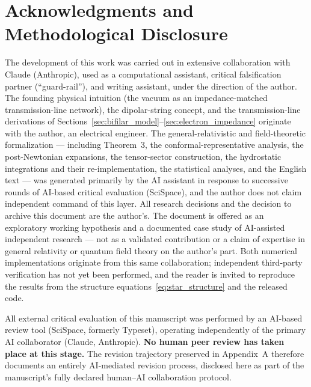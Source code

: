 \documentclass[11pt,a4paper]{article}
\theoremstyle{plain}
\theoremstyle{remark}
\begin{document}
\section*{Acknowledgments and Methodological Disclosure}
The development of this work was carried out in extensive collaboration with Claude (Anthropic), used as a computational assistant, critical falsification partner (``guard-rail''), and writing assistant, under the direction of the author. The founding physical intuition (the vacuum as an impedance-matched transmission-line network), the dipolar-string concept, and the transmission-line derivations of Sections~\ref{sec:bifilar_model}--\ref{sec:electron_impedance} originate with the author, an electrical engineer. The general-relativistic and field-theoretic formalization --- including Theorem~3, the conformal-representative analysis, the post-Newtonian expansions, the tensor-sector construction, the hydrostatic integrations and their re-implementation, the statistical analyses, and the English text --- was generated primarily by the AI assistant in response to successive rounds of AI-based critical evaluation (SciSpace), and the author does not claim independent command of this layer. All research decisions and the decision to archive this document are the author's. The document is offered as an exploratory working hypothesis and a documented case study of AI-assisted independent research --- not as a validated contribution or a claim of expertise in general relativity or quantum field theory on the author's part. Both numerical implementations originate from this same collaboration; independent third-party verification has not yet been performed, and the reader is invited to reproduce the results from the structure equations~\eqref{eq:star_structure} and the released code.

All external critical evaluation of this manuscript was performed by an AI-based review tool (SciSpace, formerly Typeset), operating independently of the primary AI collaborator (Claude, Anthropic). \textbf{No human peer review has taken place at this stage.} The revision trajectory preserved in Appendix~A therefore documents an entirely AI-mediated revision process, disclosed here as part of the manuscript's fully declared human--AI collaboration protocol.

\newpage
\appendix

\end{document}

